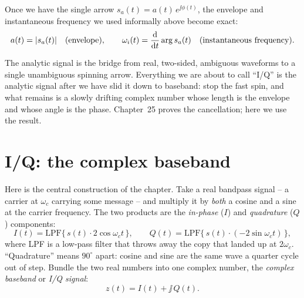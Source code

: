 Once we have the single arrow $s_a(t)=a(t)\,e^{\jj\phi(t)}$, the envelope and
instantaneous frequency we used informally above become exact:
\begin{equation}
\label{ch23:envphase}
a(t) = \lvert s_a(t)\rvert \quad(\text{envelope}),
\qquad
\omega_i(t) = \frac{\mathrm{d}}{\mathrm{d} t}\arg s_a(t) \quad(\text{instantaneous frequency}).
\end{equation}

\begin{happeningbox}
The analytic signal is the bridge from real, two-sided, ambiguous waveforms to a single
unambiguous spinning arrow. Everything we are about to call ``I/Q'' is the analytic
signal after we have slid it down to baseband: stop the fast spin, and what remains is a
slowly drifting complex number whose length is the envelope and whose angle is the phase.
Chapter~25 proves the cancellation; here we use the result.
\end{happeningbox}

\section{I/Q: the complex baseband}
\label{ch23:iq}

Here is the central construction of the chapter. Take a real bandpass signal -- a carrier
at $\omega_c$ carrying some message -- and multiply it by \emph{both} a cosine and a sine
at the carrier frequency. The two products are the \emph{in-phase} ($I$) and
\emph{quadrature} ($Q$) components:
\begin{equation}
\label{ch23:iq-mix}
I(t) = \text{LPF}\big\{\,s(t)\cdot 2\cos\omega_c t\,\big\},
\qquad
Q(t) = \text{LPF}\big\{\,s(t)\cdot (-2\sin\omega_c t)\,\big\},
\end{equation}
where LPF is a low-pass filter that throws away the copy that landed up at $2\omega_c$.
``Quadrature'' means $90^\circ$ apart: cosine and sine are the same wave a quarter
cycle out of step. Bundle the two real numbers into one complex number, the
\emph{complex baseband} or \emph{I/Q signal}:
\begin{equation}
\label{ch23:iq-complex}
z(t) = I(t) + \jj\,Q(t).
\end{equation}

